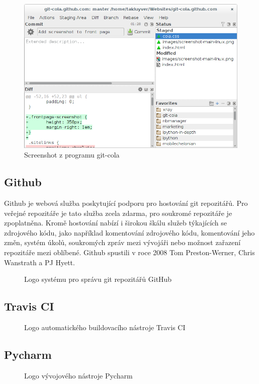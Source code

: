 \begin{figure}[H]
 \centering
 \includegraphics[width=\textwidth]{images/git-cola-screenshot}
 \caption{Screenshot z programu git-cola}
\end{figure}

\subsection{Github}

Github je webová služba poskytující podporu pro hostování git repozitářů. Pro veřejné repozitáře je tato služba zcela zdarma, pro soukromé repozitáře je zpoplatněna. Kromě hostování nabízí i širokou škálu služeb týkajících se zdrojového kódu, jako například komentování zdrojového k\'{o}du, komentování jeho změn, systém úkolů, soukromých zpráv mezi vývojáři nebo možnost zařazení repozitáře mezi oblíbené. Github spustili v roce 2008 Tom Preston-Werner, Chris Wanstrath a PJ Hyett.

\begin{figure}[H]
 \centering
 
 \caption{Logo systému pro správu git repozitářů GitHub}
\end{figure}

\subsection{Travis CI}

\begin{figure}[H]
 \centering
 
 \caption{Logo automatického buildovacího nástroje Travis CI}
\end{figure}

\subsection{Pycharm}

\begin{figure}[H]
 \centering
 
 \caption{Logo vývojového nástroje Pycharm}
\end{figure}
